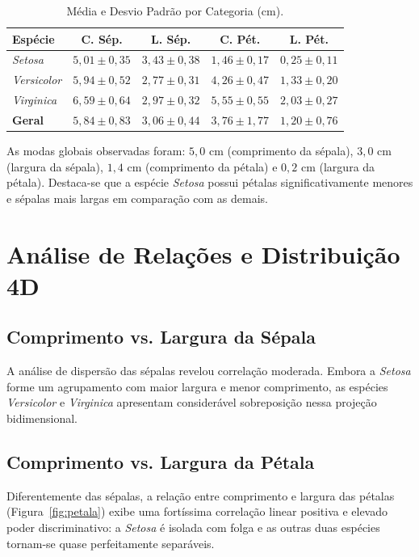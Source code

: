 \documentclass[twocolumn]{article}
\begin{document}
\begin{table}[!ht]
    \centering
    \caption{Média e Desvio Padrão por Categoria (cm).}
    \label{tab:stats}
    \footnotesize
    \begin{tabular}{lcccc}
        \toprule
        \textbf{Espécie} & \textbf{C. Sép.} & \textbf{L. Sép.} & \textbf{C. Pét.} & \textbf{L. Pét.} \\
        \midrule
        \textit{Setosa} & $5{,}01 \pm 0{,}35$ & $3{,}43 \pm 0{,}38$ & $1{,}46 \pm 0{,}17$ & $0{,}25 \pm 0{,}11$ \\
        \textit{Versicolor} & $5{,}94 \pm 0{,}52$ & $2{,}77 \pm 0{,}31$ & $4{,}26 \pm 0{,}47$ & $1{,}33 \pm 0{,}20$ \\
        \textit{Virginica} & $6{,}59 \pm 0{,}64$ & $2{,}97 \pm 0{,}32$ & $5{,}55 \pm 0{,}55$ & $2{,}03 \pm 0{,}27$ \\
        \midrule
        \textbf{Geral} & $5{,}84 \pm 0{,}83$ & $3{,}06 \pm 0{,}44$ & $3{,}76 \pm 1{,}77$ & $1{,}20 \pm 0{,}76$ \\
        \bottomrule
    \end{tabular}
\end{table}

As modas globais observadas foram: $5{,}0$ cm (comprimento da sépala), $3{,}0$ cm (largura da sépala), $1{,}4$ cm (comprimento da pétala) e $0{,}2$ cm (largura da pétala). Destaca-se que a espécie \textit{Setosa} possui pétalas significativamente menores e sépalas mais largas em comparação com as demais.

\section{Análise de Relações e Distribuição 4D}

\subsection{Comprimento vs. Largura da Sépala}
A análise de dispersão das sépalas revelou correlação moderada. Embora a \textit{Setosa} forme um agrupamento com maior largura e menor comprimento, as espécies \textit{Versicolor} e \textit{Virginica} apresentam considerável sobreposição nessa projeção bidimensional.

\subsection{Comprimento vs. Largura da Pétala}
Diferentemente das sépalas, a relação entre comprimento e largura das pétalas (Figura~\ref{fig:petala}) exibe uma fortíssima correlação linear positiva e elevado poder discriminativo: a \textit{Setosa} é isolada com folga e as outras duas espécies tornam-se quase perfeitamente separáveis.
\end{document}
